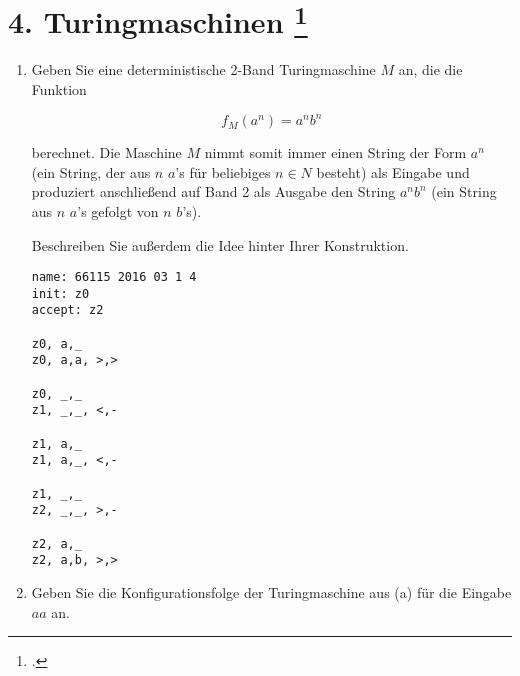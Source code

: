 \documentclass{lehramt-informatik-aufgabe}
\begin{document}
\liAufgabenTitel{}
\section{4. Turingmaschinen
\footcite{66115:2016:03}}

\begin{enumerate}


\item Geben Sie eine deterministische 2-Band Turingmaschine $M$ an, die
die Funktion

\begin{displaymath}
f_M(a^n) = a^n b^n
\end{displaymath}

berechnet. Die Maschine $M$ nimmt somit immer einen String der Form
$a^n$ (ein String, der aus $n$ $a$’s für beliebiges $n \in N$ besteht)
als Eingabe und produziert anschließend auf Band 2 als Ausgabe den
String $a^n b^n$ (ein String aus $n$ $a$’s gefolgt von $n$ $b$’s).

Beschreiben Sie außerdem die Idee hinter Ihrer Konstruktion.

\begin{liAntwort}
\begin{verbatim}
name: 66115 2016 03 1 4
init: z0
accept: z2

z0, a,_
z0, a,a, >,>

z0, _,_
z1, _,_, <,-

z1, a,_
z1, a,_, <,-

z1, _,_
z2, _,_, >,-

z2, a,_
z2, a,b, >,>
\end{verbatim}
\end{liAntwort}

\item Geben Sie die Konfigurationsfolge der Turingmaschine aus (a) für
die Eingabe $aa$ an.
\end{enumerate}
\end{document}
